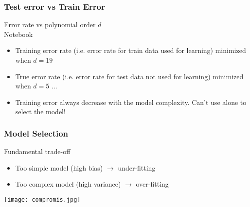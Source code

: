 \message{ !name(intro.tex)}\documentclass[pressentation,9pt,aspectratio=1610,xcolor=table]{beamer}
\newcommand{\doigt}{\noindent \Pisymbol{pzd}{43}}
\begin{document}
\begin{frame}
  \frametitle{Test error vs Train Error}
  
  \begin{minipage}{.45\textwidth}
    \begin{center}
      Error rate vs polynomial order $d$\\
      \alert{Notebook} 
    \end{center}
  \end{minipage}
  \begin{minipage}{.54\textwidth}
    \begin{itemize}
    \item Training error rate (i.e. error rate for train data used for learning) minimized when $d=19$
    \item True error rate (i.e. error rate for test data not used for learning) minimized when $d=5$ ...
  \end{itemize}
\end{minipage}

\begin{itemize}
\item[\doigt] Training error always decrease with the model complexity. \alert{Can't use alone to select the model!}
\end{itemize}


\end{frame}

\begin{frame}
  \frametitle{Model Selection}
  \begin{block}{Fundamental trade-off}
    \begin{itemize}
    \item Too simple model (high bias) $\rightarrow$ \alert{under-fitting}
    \item Too complex model (high variance) $\rightarrow$ \alert{over-fitting}
    \end{itemize}
  \end{block}
  \begin{center}
    \texttt{[image: compromis.jpg]}
  \end{center}
\end{frame}
\end{document}
